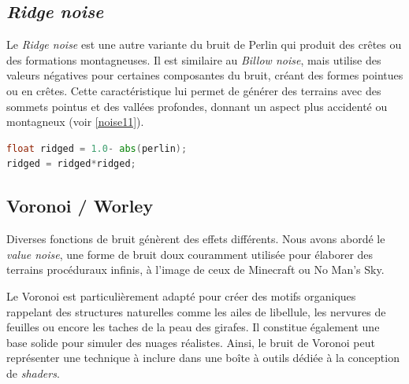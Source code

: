 \subsection*{\textit{Ridge noise}}

Le \textit{Ridge noise} est une autre variante du bruit de Perlin qui produit des crêtes ou des formations montagneuses. Il est similaire au \textit{Billow noise}, mais utilise des valeurs négatives pour certaines composantes du bruit, créant des formes pointues ou en crêtes. Cette caractéristique lui permet de générer des terrains avec des sommets pointus et des vallées profondes, donnant un aspect plus accidenté ou montagneux (voir \ref{noise11}).

\begin{minipage}{\linewidth}
\begin{lstlisting}[language=GLSL, caption=\textit{Ridge noise},captionpos=b,frame=single]
float ridged = 1.0- abs(perlin);
ridged = ridged*ridged;
\end{lstlisting}
\end{minipage}


\subsection*{Voronoi / Worley}

Diverses fonctions de bruit génèrent des effets différents. Nous avons abordé le \textit{value noise}, une forme de bruit doux couramment utilisée pour élaborer des terrains procéduraux infinis, à l'image de ceux de Minecraft ou No Man's Sky.

Le Voronoi est particulièrement adapté pour créer des motifs organiques rappelant des structures naturelles comme les ailes de libellule, les nervures de feuilles ou encore les taches de la peau des girafes. Il constitue également une base solide pour simuler des nuages réalistes. Ainsi, le bruit de Voronoi peut représenter une technique à inclure dans une boîte à outils dédiée à la conception de \textit{shaders}.

